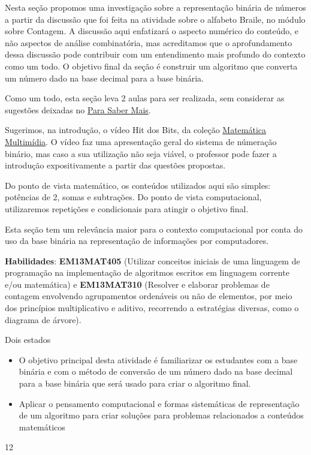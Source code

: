 \def\currentcolor{session1}
\begin{texto}
{
Nesta seção propomos uma investigação sobre a representação binária de números a partir da discussão que foi feita na atividade sobre o alfabeto Braile, no módulo sobre Contagem. A discussão aqui enfatizará o aspecto numérico do conteúdo, e não aspectos de análise combinatória, mas acreditamos que o aprofundamento dessa discussão pode contribuir com um entendimento mais profundo do contexto como um todo. O objetivo final da seção é construir um algoritmo que converta um número dado na base decimal para a base binária.

Como um todo, esta seção leva 2 aulas para ser realizada, sem considerar as sugestões deixadas no \hyperref[comp-know1]{Para Saber Mais}.

Sugerimos, na introdução, o vídeo Hit dos Bits, da coleção \href{http://www.m3.ime.unicamp.br}{Matemática Multimídia}. O vídeo faz uma apresentação geral do sistema de númeração binário, mas caso a sua utilização não seja viável, o professor pode fazer a introdução expositivamente a partir das questões propostas.

Do ponto de vista matemático, os conteúdos utilizados aqui são simples: potências de 2, somas e subtrações. Do ponto de vista computacional, utilizaremos repetições e condicionais para atingir o objetivo final.

Esta seção tem um relevância maior para o contexto computacional por conta do uso da base binária na representação de informações por computadores.

\textbf{Habilidades}: \textbf{EM13MAT405} (Utilizar conceitos iniciais de uma linguagem de programação na implementação de algoritmos escritos em linguagem corrente e/ou matemática) e \textbf{EM13MAT310} (Resolver e elaborar problemas de contagem envolvendo agrupamentos ordenáveis ou não de elementos, por meio dos princípios multiplicativo e aditivo, recorrendo a estratégias diversas, como o diagrama de árvore).

}
\end{texto}
\clearmargin
\begin{objectives}{Dois estados}
{
\begin{itemize}
\item O objetivo principal desta atividade é familiarizar os estudantes com a base binária e com o método de conversão de um número dado na base decimal para a base binária que será usado para criar o algoritmo final.

\item Aplicar o pensamento computacional e formas sistemáticas de representação de um algoritmo para criar soluções para problemas relacionados a conteúdos matemáticos
\end{itemize}
}{1}{2}
\end{objectives}
